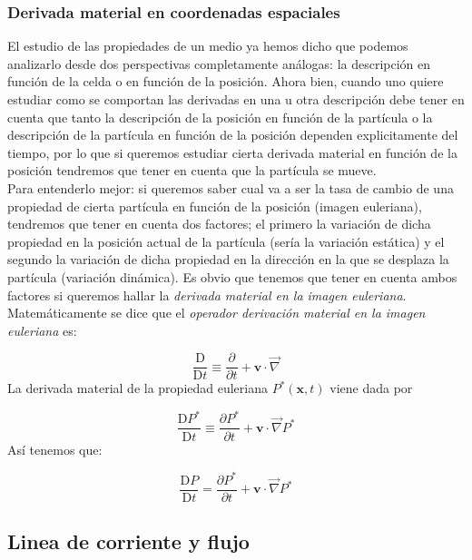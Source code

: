 \documentclass[12pt,a4paper]{article}
\numberwithin{equation}{section}
\numberwithin{figure}{section}
\newcommand{\parciales}[2]{\frac{\partial #1}{\partial #2}}
\newcommand{\Dd}{\mathrm{D}}
\newcommand{\vn}{\mathbf{v}}
\newcommand{\xn}{\mathbf{x}}
\begin{document}
\subsubsection{Derivada material en coordenadas espaciales}

El estudio de las propiedades de un medio ya hemos dicho que podemos analizarlo desde dos perspectivas completamente análogas: la descripción en función de la celda o en función de la posición. Ahora bien, cuando uno quiere estudiar como se comportan las derivadas en una u otra descripción debe tener en cuenta que tanto la descripción de la posición en función de la partícula o la descripción de la partícula en función de la posición dependen explicitamente del tiempo, por lo que si queremos estudiar cierta derivada material en función de la posición tendremos que tener en cuenta que la partícula se mueve. \\

Para entenderlo mejor: si queremos saber cual va a ser la tasa de cambio de una propiedad de cierta partícula en función de la posición (imagen euleriana), tendremos que tener en cuenta dos factores; el primero la variación de dicha propiedad en la posición actual de la partícula (sería la variación estática) y el segundo la variación de dicha propiedad en la dirección en la que se desplaza la partícula (variación dinámica). Es obvio que tenemos que tener en cuenta ambos factores si queremos hallar la \textit{derivada material en la imagen euleriana}. Matemáticamente se dice que el \textit{operador derivación material en la imagen euleriana} es:

\begin{equation}
\dfrac{\Dd}{\Dd t} \equiv \parciales{}{t} + \vn \cdot \vec{\nabla}  \label{Ec:3.1.3.008}
\end{equation}
La derivada material de la propiedad euleriana $P^*(\xn,t)$ viene dada por

\begin{equation}
\dfrac{\Dd P^*}{\Dd t} \equiv \parciales{P^*}{t} + \vn \cdot \vec{\nabla} P^*
\end{equation}
Así tenemos que:

\begin{equation}
\dfrac{\Dd P}{\Dd t} = \parciales{P^*}{t} + \vn \cdot \vec{\nabla} P^*
\end{equation}



\subsection{Linea de corriente y flujo}
\end{document}
